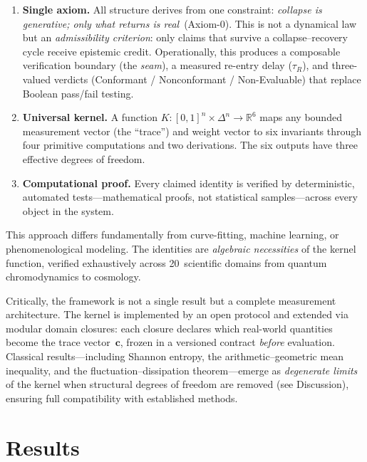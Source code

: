 \documentclass[11pt]{article}
\newcommand{\tR}{\tau_{\!R}}
\newcommand{\tvec}{\mathbf{c}}
\begin{document}
\begin{enumerate}[leftmargin=2em,itemsep=2pt]
\item \textbf{Single axiom.} All structure derives from one
  constraint: \emph{collapse is generative; only what returns is
  real}~(Axiom-0). This is not a dynamical law but an
  \emph{admissibility criterion}: only claims that survive a
  collapse--recovery cycle receive epistemic credit. Operationally,
  this produces a composable verification boundary (the \emph{seam}),
  a measured re-entry delay ($\tR$), and three-valued verdicts
  (Conformant / Nonconformant / Non-Evaluable) that replace
  Boolean pass/fail testing.
\item \textbf{Universal kernel.} A function
  $K\!:\![0,1]^n \times \Delta^n \to \mathbb{R}^6$ maps any bounded
  measurement vector (the ``trace'') and weight vector to six
  invariants through four primitive computations and two derivations.
  The six outputs have three effective degrees of freedom.
\item \textbf{Computational proof.} Every claimed identity is verified
  by deterministic, automated tests---mathematical proofs, not
  statistical samples---across every object in the system.
\end{enumerate}

This approach differs fundamentally from curve-fitting, machine
learning, or phenomenological modeling. The identities are
\emph{algebraic necessities} of the kernel function, verified
exhaustively across 20~scientific domains from quantum
chromodynamics to cosmology.

Critically, the framework is not a single result but a complete
measurement architecture. The kernel is implemented by an open
protocol and extended via modular domain closures: each closure
declares which real-world quantities become the trace
vector~$\tvec$, frozen in a versioned contract \emph{before}
evaluation. Classical results---including Shannon entropy, the
arithmetic--geometric mean inequality, and the
fluctuation--dissipation theorem---emerge as \emph{degenerate
limits} of the kernel when structural degrees of freedom are
removed (see Discussion), ensuring full compatibility with
established methods.

\section{Results}
\end{document}

